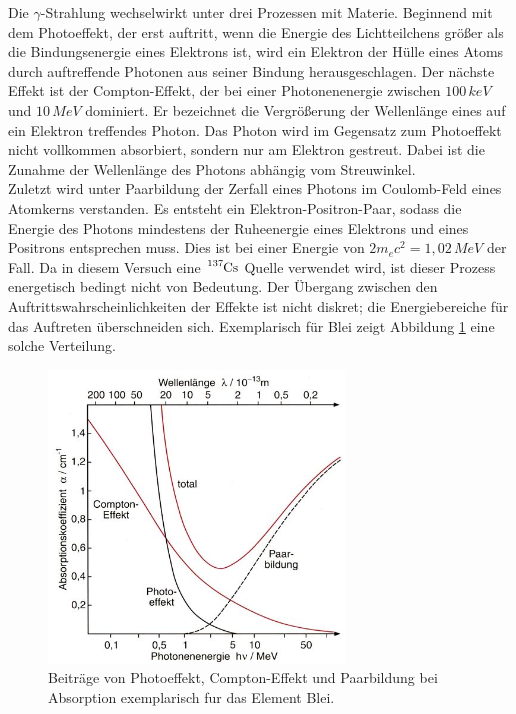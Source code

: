 Die $\gamma$-Strahlung wechselwirkt unter drei Prozessen mit Materie.
Beginnend mit dem Photoeffekt, der erst auftritt, wenn die Energie des Lichtteilchens größer als die Bindungsenergie eines Elektrons ist, wird ein Elektron der Hülle eines
Atoms durch auftreffende Photonen aus seiner Bindung herausgeschlagen.
Der nächste Effekt ist der Compton-Effekt, der bei einer Photonenenergie zwischen $100\, \si{keV}$ und $10\, \si{MeV}$ dominiert.
Er bezeichnet die Vergrößerung der Wellenlänge eines auf ein Elektron treffendes Photon.
Das Photon wird im Gegensatz zum Photoeffekt nicht vollkommen absorbiert, sondern nur am Elektron gestreut. Dabei ist die Zunahme der Wellenlänge des Photons
abhängig vom Streuwinkel.\\
Zuletzt wird unter Paarbildung der Zerfall eines Photons im Coulomb-Feld eines Atomkerns verstanden.
Es entsteht ein Elektron-Positron-Paar, sodass die Energie des Photons mindestens der Ruheenergie eines Elektrons und eines Positrons entsprechen muss.
Dies ist bei einer Energie von $2m_ec^2 = 1,02\, \si{MeV}$ der Fall.
Da in diesem Versuch eine $\ce{^{137}Cs}$ Quelle verwendet wird, ist dieser Prozess energetisch bedingt nicht von Bedeutung.
Der Übergang zwischen den Auftrittswahrscheinlichkeiten der Effekte ist nicht diskret; die Energiebereiche für das Auftreten überschneiden sich.
Exemplarisch für Blei zeigt Abbildung \ref{fig:effekte} eine solche Verteilung.

\begin{figure}[H]
  \centering
  \includegraphics[width=0.7\textwidth]{bilder/absorption.jpg}
  \caption{Beiträge von Photoeffekt, Compton-Effekt und Paarbildung bei Absorption exemplarisch fur das Element Blei.\cite{effekte}}
  \label{fig:effekte}
\end{figure}

